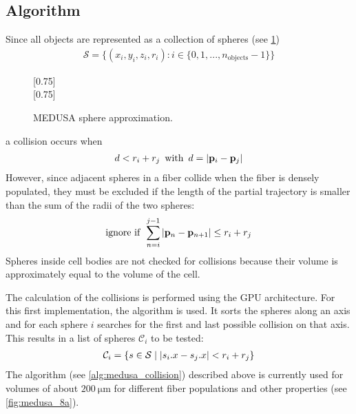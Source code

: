 \subsection{Algorithm}
%
Since all objects are represented as a collection of spheres (see \cref{fig:medusaCell})
\begin{align}
    \mathcal{S} = \{ (x_i,y_i,z_i,r_i) : i \in \{0, 1, ..., n_\text{objects}-1\}  \}
\end{align}
%
\begin{figure}[!t]
    \centering
    \setlength{\tikzwidth}{0.75\textwidth}
    [0.75\textwidth]{}
    \\[2em]
    [0.75\textwidth]{}
    \caption[]{\ac{MEDUSA} sphere approximation.}
    \label{fig:medusaCell}
\end{figure}
%
a collision occurs when
%
\begin{align}
d<r_i+r_j \enspace \text{with} \enspace d = \lvert\mathbf{p}_i - \mathbf{p}_j\rvert
\end{align}
%
However, since adjacent spheres in a fiber collide when the fiber is densely populated, they must be excluded if the length of the partial trajectory is smaller than the sum of the radii of the two spheres:
\begin{align}
\text{ignore if} \enspace \sum_{n=i}^{j-1} \, \lvert\mathbf{p}_n - \mathbf{p}_{n+1}\rvert \leq  r_i + r_j
\end{align}
%
Spheres inside cell bodies are not checked for collisions because their volume is approximately equal to the volume of the cell.
\par
%
The calculation of the collisions is performed using the GPU architecture.
For this first implementation, the algorithm  \cite{Karras2012} is used.
It sorts the spheres along an axis and for each sphere $i$ searches for the first and last possible collision on that axis.
This results in a list of spheres $\mathcal{C}_i$ to be tested:
\begin{align}
\begin{split}
\mathcal{C}_i = \{ s \in \mathcal{S} \mid \lvert s_i.x - s_j.x\rvert < r_i+r_j \}
\end{split}
\end{align}
%
The algorithm (see \cref{alg:medusa_collision}) described above is currently used for volumes of about $\SI{200}{\micro\meter}$ for different fiber populations and other properties (see \cref{fig:medusa_8a}).
